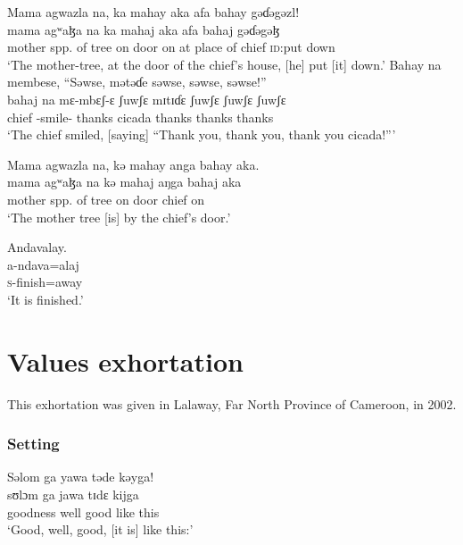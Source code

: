\ea Mama  agwazla  na,  ka  mahay  aka  afa  bahay  gəɗəgəzl!         \\
 \gll mama  agʷaɮa     na  ka   mahaj   aka   afa       bahaj  gəɗəgəɮ \\
 mother  {spp. of tree}   {\PSP}  on     door        on      {at place of}     chief   {\textsc{id}:put down}\\
 \glt ‘The mother-tree,  at the door of the chief’s house, [he] put [it] down.’  
 \z
\ea  Bahay  na  membese,  “Səwse,   mətəɗe   səwse, səwse, səwse!”\\
 \gll bahaj      na  mɛ-mbɛʃ-ɛ  ʃuwʃɛ   mɪtɪɗɛ   ʃuwʃɛ  ʃuwʃɛ  ʃuwʃɛ\\
 chief  {\PSP}  {\NOM}-smile{}-{\CL}  thanks   cicada   thanks   thanks    thanks\\
 \glt ‘The chief smiled, [saying] “Thank you, thank you, thank you cicada!”’
 \z
 
\ea  Mama  agwazla  na,  kə  mahay  anga  bahay  aka.\\
 \gll mama  agʷaɮa   na  kə  mahaj  aŋga  bahaj  aka\\
 mother  {spp. of tree}       {\PSP}  on     door  {\POSS}  chief  on\\
 \glt ‘The mother tree [is] by the chief's door.’
 \z

\ea  Andavalay.\\
 \gll a-ndava=alaj\\ 
 \textsc{s}-finish=away\\
 \glt ‘It is finished.’
\z

\clearpage
 \section[Values exhortation]{Values exhortation \\\hspace{1.5em} \textnormal{}}\setcounter{equation}{0}\label{sec:1.7}
 \hypertarget{RefHeading1210381525720847}{}
 This exhortation was given in Lalaway, Far North Province of Cameroon, in 2002.  
 
 \subsubsection*{Setting}
\ea Səlom  ga  yawa  təde  kəyga!\\
 \gll sʊlɔm  ga  jawa   tɪdɛ   kijga\\
 goodness  {\ADJ}  well  good  {like this}\\
 \glt ‘Good, well, good, [it is] like this:’
 \z

